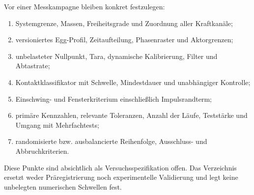 \documentclass[11pt,a4paper]{article}
\begin{document}
Vor einer Messkampagne bleiben konkret festzulegen:
\begin{enumerate}
\item Systemgrenze, Massen, Freiheitsgrade und Zuordnung aller Kraftkanäle;
\item versioniertes Egg-Profil, Zeitaufteilung, Phasenraster und Aktorgrenzen;
\item unbelasteter Nullpunkt, Tara, dynamische Kalibrierung, Filter und Abtastrate;
\item Kontaktklassifikator mit Schwelle, Mindestdauer und unabhängiger Kontrolle;
\item Einschwing- und Fensterkriterium einschließlich Impulsrandterm;
\item primäre Kennzahlen, relevante Toleranzen, Anzahl der Läufe, Teststärke und Umgang mit Mehrfachtests;
\item randomisierte bzw. ausbalancierte Reihenfolge, Ausschluss- und Abbruchkriterien.
\end{enumerate}
Diese Punkte sind absichtlich als Versuchsspezifikation offen. Das Verzeichnis ersetzt weder Präregistrierung noch experimentelle Validierung und legt keine unbelegten numerischen Schwellen fest.

\appendix
\end{document}
